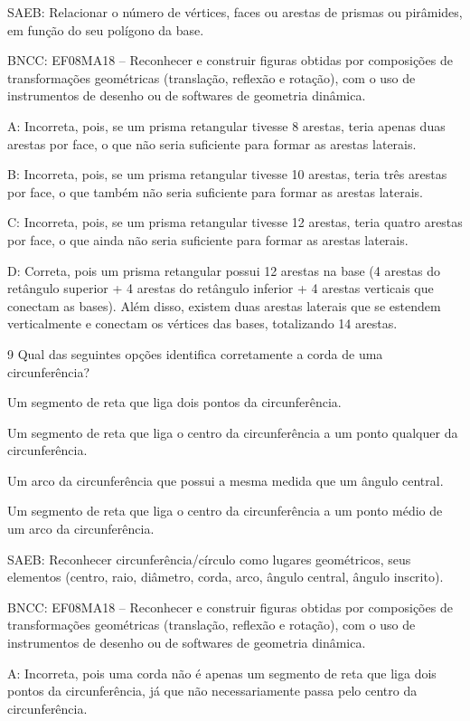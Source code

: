 {SAEB: Relacionar o número de vértices, faces ou arestas de prismas ou
pirâmides, em função do seu polígono da base.

BNCC: EF08MA18 -- Reconhecer e construir figuras obtidas por composições
de transformações geométricas (translação, reflexão e rotação), com o
uso de instrumentos de desenho ou de softwares de geometria dinâmica.

A: Incorreta, pois, se um prisma retangular tivesse 8 arestas, teria
apenas duas arestas por face, o que não seria suficiente para formar as
arestas laterais.

B: Incorreta, pois, se um prisma retangular tivesse 10 arestas, teria
três arestas por face, o que também não seria suficiente para formar as
arestas laterais.

C: Incorreta, pois, se um prisma retangular tivesse 12 arestas, teria
quatro arestas por face, o que ainda não seria suficiente para formar as
arestas laterais.

D: Correta, pois um prisma retangular possui 12 arestas na base (4
arestas do retângulo superior + 4 arestas do retângulo inferior + 4
arestas verticais que conectam as bases). Além disso, existem duas
arestas laterais que se estendem verticalmente e conectam os vértices
das bases, totalizando 14 arestas.

\num{9} Qual das seguintes opções identifica corretamente a corda de uma
circunferência?
\item Um segmento de reta que liga dois pontos da circunferência.
\item Um segmento de reta que liga o centro da circunferência a um ponto
qualquer da circunferência.
\item Um arco da circunferência que possui a mesma medida que um ângulo
central.
\item Um segmento de reta que liga o centro da circunferência a um ponto
médio de um arco da circunferência.

SAEB: Reconhecer circunferência/círculo como lugares geométricos, seus
elementos (centro, raio, diâmetro, corda, arco, ângulo central, ângulo
inscrito).

BNCC: EF08MA18 -- Reconhecer e construir figuras obtidas por composições
de transformações geométricas (translação, reflexão e rotação), com o
uso de instrumentos de desenho ou de softwares de geometria dinâmica.

A: Incorreta, pois uma corda não é apenas um segmento de reta que liga
dois pontos da circunferência, já que não necessariamente passa pelo
centro da circunferência.

}
